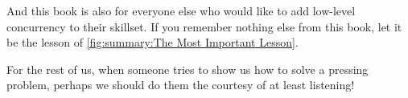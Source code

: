 And this book is also for everyone else who would like to add low-level
concurrency to their skillset.
If you remember nothing else from this book, let it be the lesson of
\cref{fig:summary:The Most Important Lesson}.

For the rest of us, when someone tries to show us how to solve a pressing
problem, perhaps we should do them the courtesy of at least listening!

